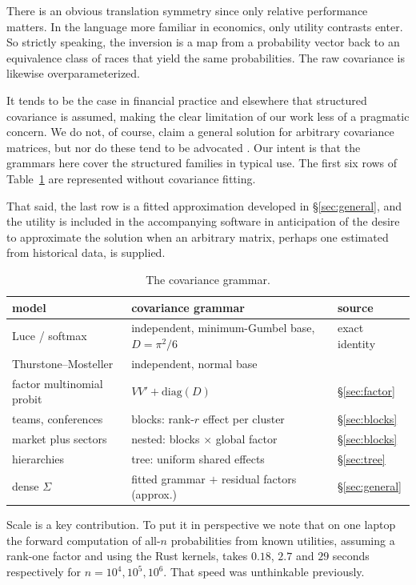 \documentclass[11pt]{article}
\begin{document}
There is an obvious translation symmetry since only relative performance matters. In the language more familiar in economics, only utility contrasts enter. So strictly speaking, the inversion is a map from a probability vector back to an equivalence class of races that yield the same probabilities. The raw covariance is likewise overparameterized.

It tends to be the case in financial practice and elsewhere that structured covariance is assumed, making the clear limitation of our work less of a pragmatic concern. We do not, of course, claim a general solution for arbitrary covariance matrices, but nor do these tend to be advocated \citep{train2009}. Our intent is that the grammars here cover the structured families in typical use. The first six rows of Table~\ref{tab:grammar} are represented without covariance fitting.

That said, the last row is a fitted approximation developed in \S\ref{sec:general}, and the utility is included in the accompanying software in anticipation of the desire to approximate the solution when an arbitrary matrix, perhaps one estimated from historical data, is supplied.

\begin{table}[h]\centering\small
\begin{tabular}{lll}
\toprule
model & covariance grammar & source \\
\midrule
Luce / softmax & independent, minimum-Gumbel base, $D=\pi^2/6$ & exact identity \\
Thurstone--Mosteller \citep{mosteller1951} & independent, normal base & \citet{cotton2021} \\
factor multinomial probit & $VV'+\mathrm{diag}(D)$ & \S\ref{sec:factor} \\
teams, conferences & blocks: rank-$r$ effect per cluster & \S\ref{sec:blocks} \\
market plus sectors & nested: blocks $\times$ global factor & \S\ref{sec:blocks} \\
hierarchies & tree: uniform shared effects & \S\ref{sec:tree} \\
dense $\Sigma$ & fitted grammar $+$ residual factors (approx.) & \S\ref{sec:general} \\
\bottomrule
\end{tabular}
\caption{The covariance grammar.}\label{tab:grammar}
\end{table}

Scale is a key contribution. To put it in perspective we note that on one laptop the forward computation of all-$n$ probabilities from known utilities, assuming a rank-one factor and using the Rust kernels, takes $0.18$, $2.7$ and $29$ seconds respectively for $n=10^{4},10^{5},10^{6}$. That speed was unthinkable previously.
\end{document}
